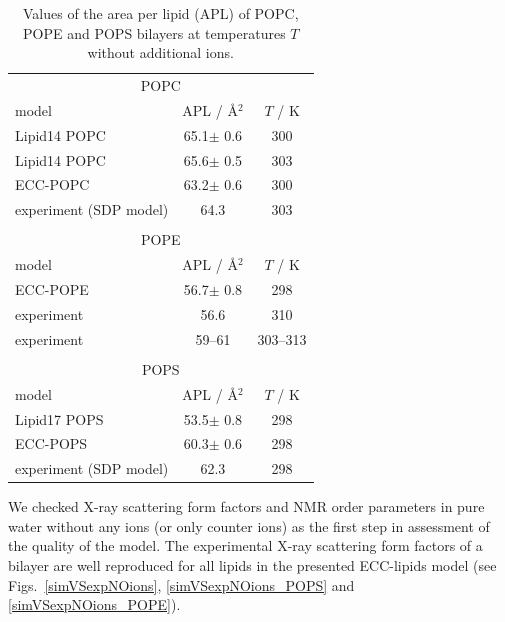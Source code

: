 \begin{table}[tb!] 
\centering
  \caption{Values of the area per lipid (APL) of POPC, POPE and POPS bilayers 
           at temperatures $T$ without additional ions. \label{tab:apls} } 
  \begin{tabular}{l|c c} 
    \multicolumn{3}{c}{POPC} \\
    model          & APL / Å$^2$   & $T$ / K  \\ 
    \hline 
    Lipid14 POPC                    & 65.1$\pm$ 0.6  &  300 \\ 
    Lipid14 POPC \citep{dickson14}  & 65.6$\pm$ 0.5  &  303 \\ 
    \hline 
    ECC-POPC     \citep{melcr18}    & 63.2$\pm$ 0.6  &  300       \\ 
    \hline 
    experiment (SDP model) \citep{kucerka11} & 64.3  &  303    \\ 
    \hline 
    \multicolumn{3}{c}{} \\
    \multicolumn{3}{c}{POPE} \\
    model          & APL / Å$^2$   & $T$ / K  \\ 
    \hline 
    ECC-POPE                 & 56.7$\pm$ 0.8  &  298 \\ 
    \hline 
    experiment   \citep{parsegian89} & 56.6  &  310    \\ 
    experiment   \citep{rappolt03}   & 59--61 &  303--313  \\ 
    \hline 
    \multicolumn{3}{c}{} \\
    \multicolumn{3}{c}{POPS} \\
    model          & APL / Å$^2$   & $T$ / K  \\ 
    \hline 
    Lipid17 POPS              & 53.5$\pm$ 0.8  &  298 \\ 
    \hline 
    ECC-POPS                & 60.3$\pm$ 0.6  &  298       \\ 
    \hline 
    experiment (SDP model) \cite{SDP-CHARMM36_comparison_paper_Samuli-knows} & 62.3  &  298    \\ 
    \hline 
  \end{tabular} 
\end{table} 
 
 
We checked X-ray scattering form factors and NMR order parameters 
in pure water without any ions (or only counter ions)
as the first step in assessment of the quality of the model. 
The experimental X-ray scattering form factors 
of a bilayer are well reproduced for all lipids in the presented ECC-lipids model 
(see Figs.~\ref{simVSexpNOions}, \ref{simVSexpNOions_POPS} and \ref{simVSexpNOions_POPE}). 

